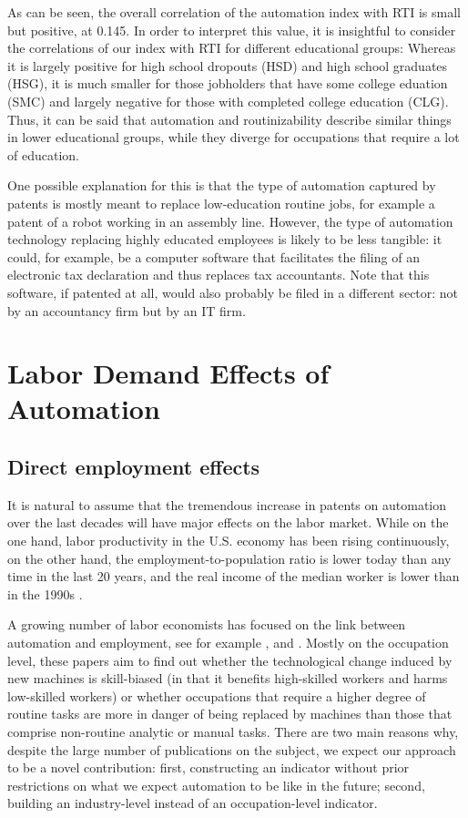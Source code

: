 \documentclass[11pt,a4paper]{article}
\begin{document}
As can be seen, the overall correlation of the automation index with RTI is small but positive, at 0.145. In order to interpret this value, it is insightful to consider the correlations of our index with RTI for different educational groups: Whereas it is largely positive for high school dropouts (HSD) and high school graduates (HSG), it is much smaller for those jobholders that have some college eduation (SMC) and largely negative for those with completed college education (CLG). Thus, it can be said that automation and routinizability describe similar things in lower educational groups, while they diverge for occupations that require a lot of education.

One possible explanation for this is that the type of automation captured by patents is mostly meant to replace low-education routine jobs, for example a patent of a robot working in an assembly line. However, the type of automation technology replacing highly educated employees is likely to be less tangible: it could, for example, be a computer software that facilitates the filing of an electronic tax declaration and thus replaces tax accountants. Note that this software, if patented at all, would also probably be filed in a different sector: not by an accountancy firm but by an IT firm.



\section{Labor Demand Effects of Automation}

\subsection{Direct employment effects}
It is natural to assume that the tremendous increase in patents on automation over the last decades will have major effects on the labor market. While on the one hand, labor productivity in the U.S. economy has been rising continuously, on the other hand, the employment-to-population ratio is lower today than any time in the last 20 years, and the real income of the median worker is lower than in the 1990s \citep[p.~164]{BM2014}. 

A growing number of labor economists has focused on the link between automation and employment, see for example \cite{ALM2003}, \cite{GM2007} and \cite{AKK2008}. Mostly on the occupation level, these papers aim to find out whether the technological change induced by new machines is skill-biased (in that it benefits high-skilled workers and harms low-skilled workers) or whether occupations that require a higher degree of routine tasks are more in danger of being replaced by machines than those that comprise non-routine analytic or manual tasks. There are two main reasons why, despite the large number of publications on the subject, we expect our approach to be a novel contribution: first, constructing an indicator without prior restrictions on what we expect automation to be like in the future; second, building an industry-level instead of an occupation-level indicator.
\end{document}
